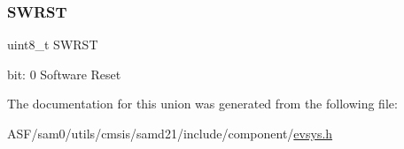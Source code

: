 \subsubsection{\texorpdfstring{SWRST}{SWRST}}
{\footnotesize\ttfamily uint8\+\_\+t S\+W\+R\+ST}

bit\+: 0 Software Reset 

The documentation for this union was generated from the following file\+:\begin{DoxyCompactItemize}
\item 
A\+S\+F/sam0/utils/cmsis/samd21/include/component/\mbox{\hyperlink{component_2evsys_8h}{evsys.\+h}}\end{DoxyCompactItemize}
